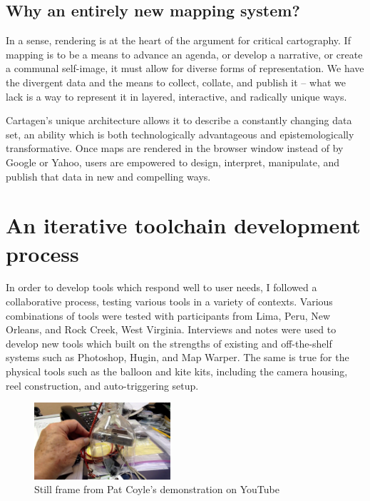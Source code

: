 \documentclass[11pt,oneside,notitlepage]{report}
\begin{document}
\subsection{Why an entirely new mapping system?}

In a sense, rendering is at the heart of the argument for critical cartography. If mapping is to be a means to advance an agenda, or develop a narrative, or create a communal self-image, it must allow for diverse forms of representation. We have the divergent data and the means to collect, collate, and publish it – what we lack is a way to represent it in layered, interactive, and radically unique ways. 

Cartagen's unique architecture allows it to describe a constantly changing data set, an ability which is both technologically advantageous and epistemologically transformative. Once maps are rendered in the browser window instead of by Google or Yahoo, users are empowered to design, interpret, manipulate, and publish that data in new and compelling ways. 

\section{An iterative toolchain development process}

In order to develop tools which respond well to user needs, I followed a collaborative process, testing various tools in a variety of contexts. Various combinations of tools were tested with participants from Lima, Peru, New Orleans, and Rock Creek, West Virginia. Interviews and notes were used to develop new tools which built on the strengths of existing and off-the-shelf systems such as Photoshop, Hugin, and Map Warper. The same is true for the physical tools such as the balloon and kite kits, including the camera housing, reel construction, and auto-triggering setup. 

\begin{figure}
	\begin{flushright}
		\includegraphics[width=0.45\textwidth]{images/pat-coyle-video.png}
		\caption{Still frame from Pat Coyle's demonstration on YouTube \cite{coyle2010sodabottle}}
	\end{flushright}
\end{figure}
\end{document}
